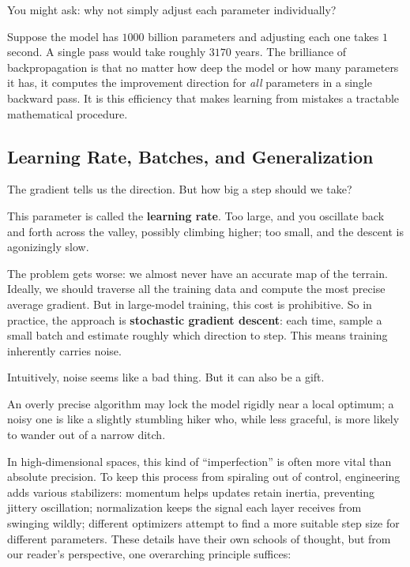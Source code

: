 \vspace{1em}

You might ask: why not simply adjust each parameter individually?

Suppose the model has $1000$ billion parameters and adjusting each one takes $1$ second. A single pass would take roughly $3170$ years. The brilliance of backpropagation is that no matter how deep the model or how many parameters it has, it computes the improvement direction for \textit{all} parameters in a single backward pass. It is this efficiency that makes learning from mistakes a tractable mathematical procedure.



\subsection{Learning Rate, Batches, and Generalization}

The gradient tells us the direction. But how big a step should we take?

This parameter is called the \textbf{learning rate}. Too large, and you oscillate back and forth across the valley, possibly climbing higher; too small, and the descent is agonizingly slow.

The problem gets worse: we almost never have an accurate map of the terrain. Ideally, we should traverse all the training data and compute the most precise average gradient. But in large-model training, this cost is prohibitive. So in practice, the approach is \textbf{stochastic gradient descent}: each time, sample a small batch and estimate roughly which direction to step.
This means training inherently carries noise.

\vspace{1em}

Intuitively, noise seems like a bad thing. But it can also be a gift.

An overly precise algorithm may lock the model rigidly near a local optimum; a noisy one is like a slightly stumbling hiker who, while less graceful, is more likely to wander out of a narrow ditch.

\vspace{1em}

In high-dimensional spaces, this kind of ``imperfection'' is often more vital than absolute precision.
To keep this process from spiraling out of control, engineering adds various stabilizers: momentum helps updates retain inertia, preventing jittery oscillation; normalization keeps the signal each layer receives from swinging wildly; different optimizers attempt to find a more suitable step size for different parameters.
These details have their own schools of thought, but from our reader's perspective, one overarching principle suffices:

